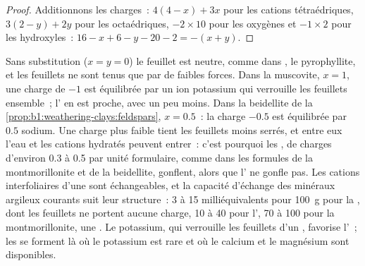 \begin{proof}
Additionnons les charges~: $4(4 - x) + 3x$ pour les cations tétraédriques, $3(2 - y) + 2y$
pour les octaédriques, $-2\times10$ pour les oxygènes et $-1\times2$ pour les
hydroxyles~: $16 - x + 6 - y - 20 - 2 = -(x + y)$.
\end{proof}

Sans substitution ($x = y = 0$) le feuillet est neutre, comme dans
, le  pyrophyllite, et les feuillets ne sont tenus que par de
faibles forces.
Dans la muscovite, $x = 1$, une charge de $-1$ est équilibrée par un ion potassium qui
verrouille les feuillets ensemble~; l' en est proche, avec un peu moins. Dans la
beidellite de la \cref{prop:b1:weathering-clays:feldspars}, $x = 0.5$~: la charge
$-0.5$ est équilibrée par $0.5$ sodium. Une charge plus faible tient les feuillets moins
serrés, et entre eux l'eau et les cations hydratés peuvent entrer~: c'est pourquoi
les , de charges d'environ 0.3 à 0.5 par unité formulaire, comme dans les
formules de la montmorillonite et de la beidellite, gonflent, alors que l' ne gonfle pas. Les
cations interfoliaires d'une  sont échangeables, et la capacité d'échange des
minéraux argileux courants suit leur structure~: 3 à 15 milliéquivalents pour
\qty{100}{g} pour la , dont les feuillets ne portent aucune charge, 10 à 40 pour l',
70 à 100 pour la montmorillonite, une . Le potassium, qui verrouille les feuillets
d'un , favorise l'~; les  se forment là où le potassium est rare et
où le calcium et le magnésium sont disponibles.

